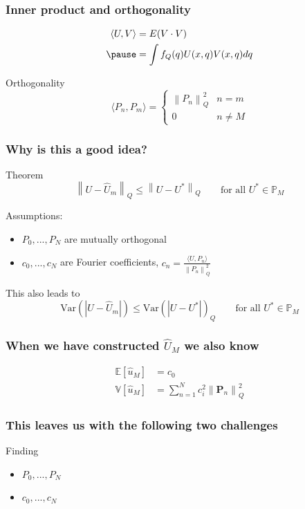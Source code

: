 \documentclass[handout]{beamer}
\newcommand{\p}{\boldsymbol{P}}
\newcommand{\norm}[1]{\left\lVert#1\right\rVert}
\begin{document}
\begin{frame}
  \frametitle{Inner product and orthogonality}

    \begin{align*}
    \langle U,V \rangle &= E(V\cdot V)\\
    \pause
    &= \int f_Q(q)U(x,q)V(x,q)dq
  \end{align*}

  \pause
  Orthogonality
  \[\langle P_n,P_m\rangle =
  \begin{cases}
    \norm{P_n}^2_Q & n = m \\
    0 & n \neq M
  \end{cases}\]

\end{frame}

\begin{frame}
\frametitle{Why is this a good idea?}
\begin{block}{Theorem}
  \[\norm{U-\hat{U}_m}_Q \leq \norm{U-U^*}_Q \qquad \text{for all } U^* \in \mathbb{P}_M\]
\end{block}
Assumptions: 
\begin{itemize}
  \item $P_0,...,P_N$ are mutually orthogonal
  \item $c_0,...,c_N$ are Fourier coefficients, $c_n = \frac{\langle U, P_n\rangle}{\norm{P_n}^2_Q}$
 \end{itemize}
 This also leads to 
  \[\text{Var}(|U-\hat{U}_m|)\leq \text{Var}(|U-U^*|)_Q \qquad \text{for all } U^* \in \mathbb{P}_M\]
\end{frame}

\begin{frame}
 \frametitle{When we have constructed $\hat U_M$ we also know}
   \begin{align*}
  \mathbb E[\hat u_M] &= c_0\\
  \mathbb V[\hat u_M] &= \sum_{n=1}^N c_i^2\norm{\p_n}_{Q}^2
  \end{align*}
\end{frame}

\begin{frame}
 \frametitle{This leaves us with the following two challenges}
 
 Finding
 \begin{itemize}
  \item $P_0,...,P_N$
  \item $c_0,...,c_N$
 \end{itemize}

\end{frame}
\end{document}
